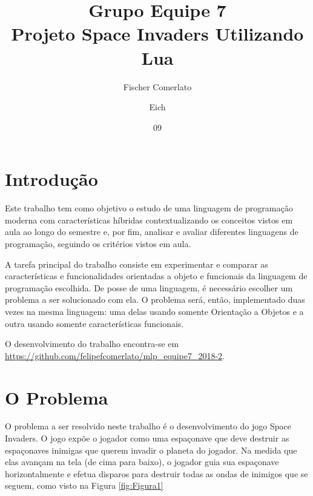\documentclass[rel_mlp]{iiufrgs}
\title{Grupo Equipe 7 \\ Projeto Space Invaders Utilizando Lua}
\author{Fischer Comerlato}{Felipe} %
\author{Eich}{Leonardo} %
\date{09}{2018}
\begin{document}
\maketitle      


\tableofcontents








%
\chapter{Introdução} \label{intro}

Este trabalho tem como objetivo o estudo de uma linguagem de programação moderna com características híbridas contextualizando os conceitos vistos em aula ao longo do semestre e, por fim, analisar e avaliar diferentes linguagens de programação, seguindo os critérios vistos em aula.

A tarefa principal do trabalho consiste em experimentar e comparar as características e funcionalidades orientadas a objeto e funcionais da linguagem de programação escolhida. De posse de uma linguagem, é necessário escolher um problema a ser solucionado com ela. O problema será, então, implementado duas vezes na mesma linguagem: uma delas usando somente Orientação a Objetos e a outra usando somente características funcionais.

O desenvolvimento do trabalho encontra-se em \url{https://github.com/felipefcomerlato/mlp_equipe7_2018-2}.


\chapter{O Problema}
O problema a ser resolvido neste trabalho é o desenvolvimento do jogo Space Invaders. O jogo expõe o jogador como uma espaçonave que deve destruir as espaçonaves inimigas que querem invadir o planeta do jogador. Na medida que elas avançam na tela (de cima para baixo), o jogador guia sua espaçonave horizontalmente e efetua disparos para destruir todas as ondas de inimigos que se seguem, como visto na Figura \ref{fig:Figura1}
\end{document}
